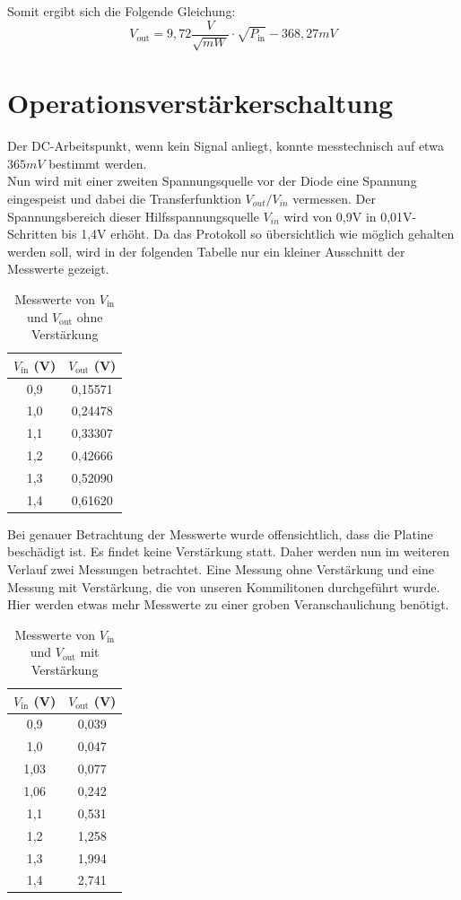 Somit ergibt sich die Folgende Gleichung:
\begin{equation}
    V_\text{out} = 9,72 \frac{V}{\sqrt{mW}} \cdot \sqrt{P_\text{in}} - 368,27 mV
\end{equation}
\section{Operationsverstärkerschaltung} %
Der DC-Arbeitspunkt, wenn kein Signal anliegt, konnte messtechnisch auf etwa $365mV$ bestimmt werden.
\\
Nun wird mit einer zweiten Spannungsquelle vor der Diode eine Spannung eingespeist und dabei die Transferfunktion
$V_{out}/V_{in}$ vermessen. Der Spannungsbereich dieser Hilfsspannungsquelle $V_{in}$ wird von 0,9V in 0,01V-Schritten bis 1,4V erhöht.
Da das Protokoll so übersichtlich wie möglich gehalten werden soll, wird in der folgenden Tabelle nur ein kleiner Ausschnitt der
Messwerte gezeigt.
\begin{table}[h]
\centering
\begin{tabular}{|c|c|}
\hline
$V_{\text{in}}$ (V) & $V_{\text{out}}$ (V) \\
\hline
0{,}9 & 0{,}15571 \\
1{,}0 & 0{,}24478 \\
1{,}1 & 0{,}33307 \\
1{,}2 & 0{,}42666 \\
1{,}3 & 0{,}52090 \\
1{,}4 & 0{,}61620 \\
\hline
\end{tabular}
\caption{Messwerte von $V_{\text{in}}$ und $V_{\text{out}}$ ohne Verstärkung}
\end{table}
Bei genauer Betrachtung der Messwerte wurde offensichtlich, dass die Platine beschädigt ist. Es findet keine Verstärkung
statt. Daher werden nun im weiteren Verlauf zwei Messungen betrachtet. Eine Messung ohne Verstärkung und eine Messung mit Verstärkung, die von 
unseren Kommilitonen durchgeführt wurde. Hier werden etwas mehr Messwerte zu einer groben Veranschaulichung benötigt. \\


\begin{table}[h]
\centering
\begin{tabular}{|c|c|}
\hline
$V_{\text{in}}$ (V) & $V_{\text{out}}$ (V) \\
\hline
0{,}9 & 0{,}039 \\
1{,}0 & 0{,}047\\
1{,}03 & 0{,}077 \\
1{,}06 & 0{,}242 \\
1{,}1 & 0{,}531 \\
1{,}2 & 1{,}258 \\
1{,}3 & 1{,}994 \\
1{,}4 & 2{,}741 \\
\hline
\end{tabular}
\caption{Messwerte von $V_{\text{in}}$ und $V_{\text{out}}$ mit Verstärkung}
\end{table}

